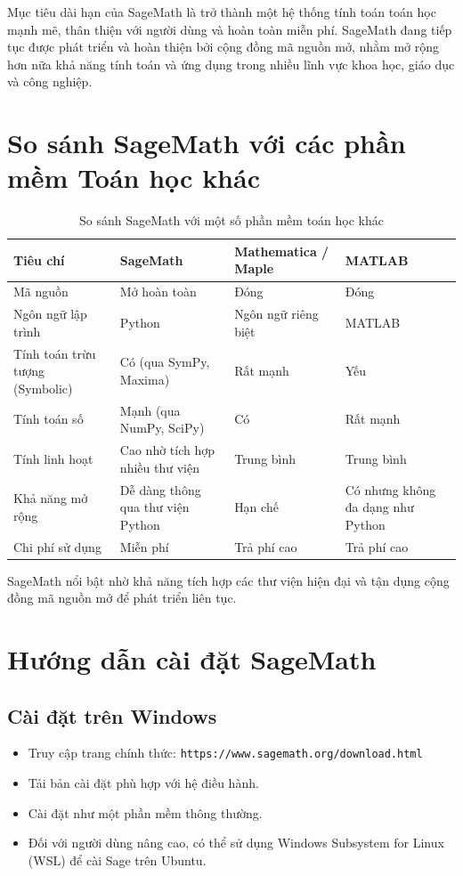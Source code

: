 Mục tiêu dài hạn của SageMath là trở thành một hệ thống tính toán toán học mạnh mẽ, thân thiện với người dùng và hoàn toàn miễn phí. SageMath đang tiếp tục được phát triển và hoàn thiện bởi cộng đồng mã nguồn mở, nhằm mở rộng hơn nữa khả năng tính toán và ứng dụng trong nhiều lĩnh vực khoa học, giáo dục và công nghiệp.

\section{So sánh SageMath với các phần mềm Toán học khác}
\begin{table}[H]
	\centering
	\begin{tabularx}{\textwidth}{|X|X|X|X|}
		\hline
		\textbf{Tiêu chí} & \textbf{SageMath} & \textbf{Mathematica / Maple} & \textbf{MATLAB} \\ \hline
		Mã nguồn & Mở hoàn toàn & Đóng & Đóng \\ \hline
		Ngôn ngữ lập trình & Python & Ngôn ngữ riêng biệt & MATLAB \\ \hline
		Tính toán trừu tượng (Symbolic) & Có (qua SymPy, Maxima) & Rất mạnh & Yếu \\ \hline
		Tính toán số & Mạnh (qua NumPy, SciPy) & Có & Rất mạnh \\ \hline
		Tính linh hoạt & Cao nhờ tích hợp nhiều thư viện & Trung bình & Trung bình \\ \hline
		Khả năng mở rộng & Dễ dàng thông qua thư viện Python & Hạn chế & Có nhưng không đa dạng như Python \\ \hline
		Chi phí sử dụng & Miễn phí & Trả phí cao & Trả phí cao \\ \hline
	\end{tabularx}
	\caption{So sánh SageMath với một số phần mềm toán học khác}
\end{table}

SageMath nổi bật nhờ khả năng tích hợp các thư viện hiện đại và tận dụng cộng đồng mã nguồn mở để phát triển liên tục.

\section{Hướng dẫn cài đặt SageMath}

\subsection*{Cài đặt trên Windows}

\begin{itemize}
	\item Truy cập trang chính thức: \texttt{https://www.sagemath.org/download.html}
	\item Tải bản cài đặt phù hợp với hệ điều hành.
	\item Cài đặt như một phần mềm thông thường.
	\item Đối với người dùng nâng cao, có thể sử dụng Windows Subsystem for Linux (WSL) để cài Sage trên Ubuntu.
\end{itemize}

